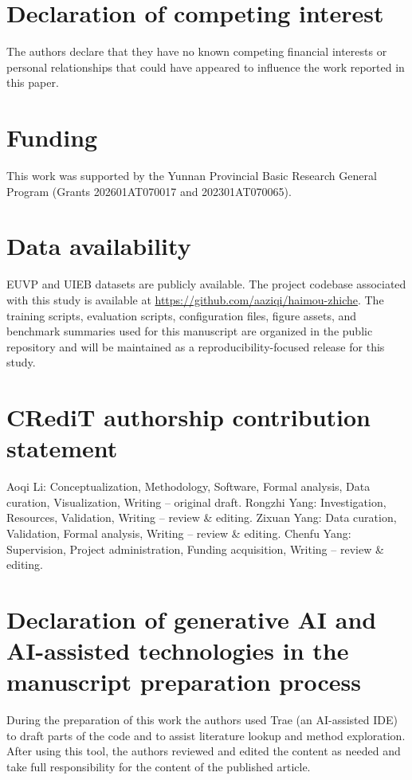 \documentclass[final,1p,times]{elsarticle}
\begin{document}
\section*{Declaration of competing interest}
The authors declare that they have no known competing financial interests or personal relationships that could have appeared to influence the work reported in this paper.

\section*{Funding}
This work was supported by the Yunnan Provincial Basic Research General Program (Grants 202601AT070017 and 202301AT070065).

\section*{Data availability}
EUVP and UIEB datasets are publicly available. The project codebase associated with this study is available at \url{https://github.com/aaziqi/haimou-zhiche}. The training scripts, evaluation scripts, configuration files, figure assets, and benchmark summaries used for this manuscript are organized in the public repository and will be maintained as a reproducibility-focused release for this study.

\section*{CRediT authorship contribution statement}
Aoqi Li: Conceptualization, Methodology, Software, Formal analysis, Data curation, Visualization, Writing -- original draft. 
Rongzhi Yang: Investigation, Resources, Validation, Writing -- review \& editing. 
Zixuan Yang: Data curation, Validation, Formal analysis, Writing -- review \& editing. 
Chenfu Yang: Supervision, Project administration, Funding acquisition, Writing -- review \& editing.

\section*{Declaration of generative AI and AI-assisted technologies in the manuscript preparation process}
During the preparation of this work the authors used Trae (an AI-assisted IDE) to draft parts of the code and to assist literature lookup and method exploration. After using this tool, the authors reviewed and edited the content as needed and take full responsibility for the content of the published article.
\end{document}
